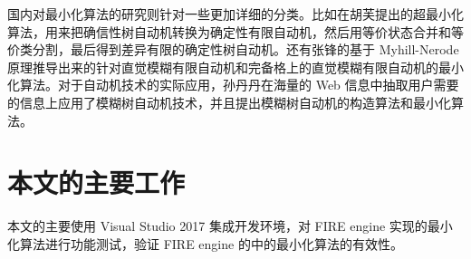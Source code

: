 国内对最小化算法的研究则针对一些更加详细的分类。比如在胡芙提出的超最小化算法，用来把确信性树自动机转换为确定性有限自动机，然后用等价状态合并和等价类分割，最后得到差异有限的确定性树自动机\cite{hfTreeFA}。还有张锋的基于 Myhill-Nerode 原理推导出来的针对直觉模糊有限自动机和完备格上的直觉模糊有限自动机的最小化算法\cite{zf14Min}。对于自动机技术的实际应用，孙丹丹在海量的 Web 信息中抽取用户需要的信息上应用了模糊树自动机技术，并且提出模糊树自动机的构造算法和最小化算法\cite{sdd14}。 

\section{本文的主要工作}

本文的主要使用 Visual Studio 2017 集成开发环境，对 FIRE engine 实现的最小化算法进行功能测试，验证 FIRE engine 的中的最小化算法的有效性\cite{lmw19}。
